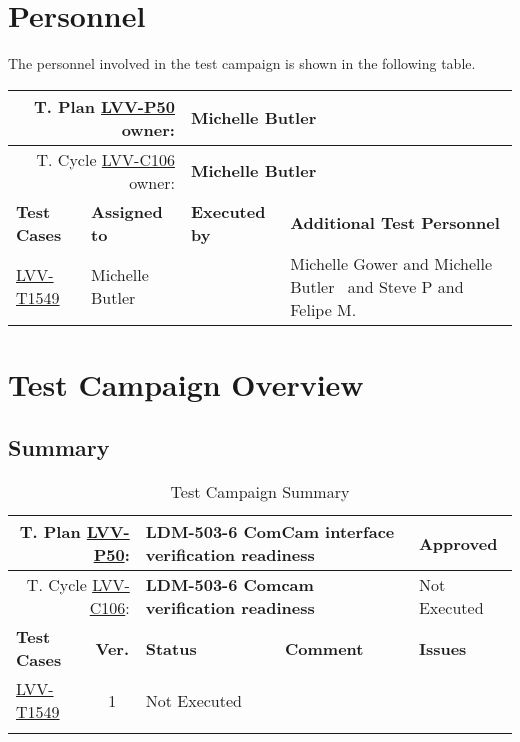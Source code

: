 \documentclass[DM,lsstdraft,STR,toc]{lsstdoc}
\begin{document}
\newpage
\section{Personnel}
\label{sect:personnel}

The personnel involved in the test campaign is shown in the following table.

{\small
\begin{longtable}{p{3cm}p{3cm}p{3cm}p{6cm}}
\hline
\multicolumn{2}{r}{T. Plan \href{https://jira.lsstcorp.org/secure/Tests.jspa\#/testPlan/LVV-P50}{LVV-P50} owner:} &
\multicolumn{2}{l}{\textbf{ Michelle Butler } }\\\hline
\multicolumn{2}{r}{T. Cycle \href{https://jira.lsstcorp.org/secure/Tests.jspa\#/testCycle/LVV-C106}{LVV-C106} owner:} &
\multicolumn{2}{l}{\textbf{
Michelle Butler }
} \\\hline
\textbf{Test Cases} & \textbf{Assigned to} & \textbf{Executed by} & \textbf{Additional Test Personnel} \\ \hline
\href{https://jira.lsstcorp.org/secure/Tests.jspa#/testCase/LVV-T1549}{LVV-T1549}
& {\small Michelle Butler } & {\small  } &
\begin{minipage}[]{6cm}
\smallskip
{\small Michelle Gower and Michelle Butler ~and Steve P and Felipe M.~ }
\medskip
\end{minipage}
\\ \hline
\end{longtable}
}

\newpage

\section{Test Campaign Overview}
\label{sect:overview}

\subsection{Summary}
\label{sect:summarytable}

{\small
\begin{longtable}{p{2cm}cp{2.3cm}p{8.6cm}p{2.3cm}}
\toprule
\multicolumn{2}{r}{ T. Plan \href{https://jira.lsstcorp.org/secure/Tests.jspa\#/testPlan/LVV-P50}{LVV-P50}:} &
\multicolumn{2}{p{10.9cm}}{\textbf{ LDM-503-6 ComCam interface verification readiness }} & Approved \\\hline
\multicolumn{2}{r}{ T. Cycle \href{https://jira.lsstcorp.org/secure/Tests.jspa\#/testCycle/LVV-C106}{LVV-C106}:} &
\multicolumn{2}{p{10.9cm}}{\textbf{ LDM-503-6 Comcam verification readiness }} & Not Executed \\\hline
\textbf{Test Cases} &  \textbf{Ver.} & \textbf{Status} & \textbf{Comment} & \textbf{Issues} \\\toprule
\href{https://jira.lsstcorp.org/secure/Tests.jspa#/testCase/LVV-T1549}{LVV-T1549}
&  1
& Not Executed &
\begin{minipage}[]{9cm}
\smallskip

\medskip
\end{minipage}
&
\\\hline
\caption{Test Campaign Summary}
\label{table:summary}
\end{longtable}
}
\end{document}
